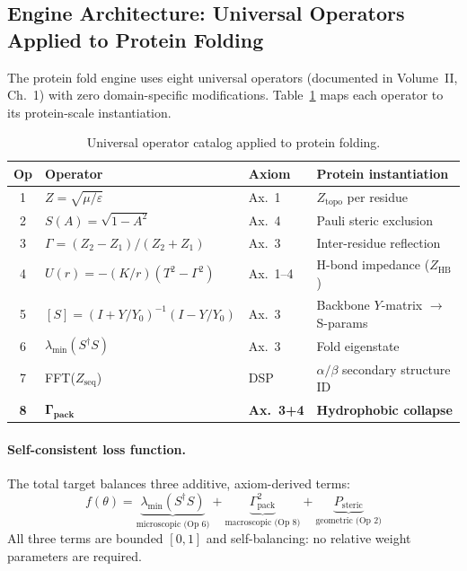 \subsection{Engine Architecture: Universal Operators Applied to Protein Folding}
\label{sec:engine_architecture}

The protein fold engine uses eight universal operators
(documented in Volume~II, Ch.~1) with zero domain-specific
modifications.  Table~\ref{tab:op_catalog} maps each operator
to its protein-scale instantiation.

\begin{table}[H]
\centering\small
\caption{Universal operator catalog applied to protein folding.}
\label{tab:op_catalog}
\begin{tabular}{clll}
\toprule
\textbf{Op} & \textbf{Operator} & \textbf{Axiom}
  & \textbf{Protein instantiation} \\
\midrule
1 & $Z = \sqrt{\mu/\varepsilon}$
  & Ax.~1
  & $Z_\text{topo}$ per residue \\
2 & $S(A) = \sqrt{1-A^2}$
  & Ax.~4
  & Pauli steric exclusion \\
3 & $\Gamma = (Z_2-Z_1)/(Z_2+Z_1)$
  & Ax.~3
  & Inter-residue reflection \\
4 & $U(r) = -(K/r)(T^2-\Gamma^2)$
  & Ax.~1--4
  & H-bond impedance ($Z_\text{HB}$) \\
5 & $[S] = (I+Y/Y_0)^{-1}(I-Y/Y_0)$
  & Ax.~3
  & Backbone $Y$-matrix $\to$ S-params \\
6 & $\lambda_\text{min}(S^\dagger S)$
  & Ax.~3
  & Fold eigenstate \\
7 & FFT($Z_\text{seq}$)
  & DSP
  & $\alpha/\beta$ secondary structure ID \\
\textbf{8} & $\boldsymbol{\Gamma_\text{pack}}$
  & \textbf{Ax.~3+4}
  & \textbf{Hydrophobic collapse} \\
\bottomrule
\end{tabular}
\end{table}

\paragraph{Self-consistent loss function.}
The total target balances three additive, axiom-derived terms:
\begin{equation}
    f(\theta) = \underbrace{\lambda_\text{min}(S^\dagger S)}_{\text{microscopic (Op 6)}}
              + \underbrace{\Gamma_\text{pack}^2}_{\text{macroscopic (Op 8)}}
              + \underbrace{P_\text{steric}}_{\text{geometric (Op 2)}}
    \label{eq:self_consistent_loss}
\end{equation}
All three terms are bounded $[0,1]$ and self-balancing:
no relative weight parameters are required.

